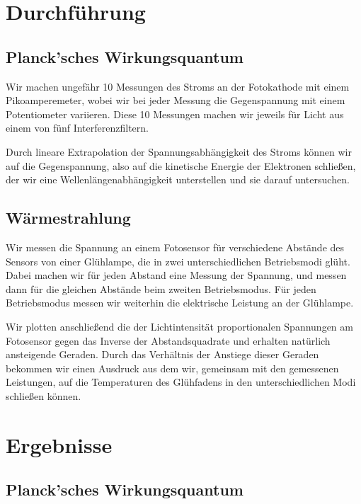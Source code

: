 \documentclass[12pt,a4paper,twopage]{article}
\begin{document}
\section{Durchführung}
\subsection{Planck'sches Wirkungsquantum}
Wir machen ungefähr 10 Messungen des Stroms an der Fotokathode mit einem Pikoamperemeter, wobei wir bei jeder Messung die Gegenspannung mit einem Potentiometer variieren. Diese 10 Messungen machen wir jeweils für Licht aus einem von fünf Interferenzfiltern.  

Durch lineare Extrapolation der Spannungsabhängigkeit des Stroms können wir auf die Gegenspannung, also auf die kinetische Energie der Elektronen schließen, der wir eine Wellenlängenabhängigkeit unterstellen und sie darauf untersuchen.
\subsection{Wärmestrahlung}
Wir messen die Spannung an einem Fotosensor für verschiedene Abstände des Sensors von einer Glühlampe, die in zwei unterschiedlichen Betriebsmodi glüht. Dabei machen wir für jeden Abstand eine Messung der Spannung, und messen dann für die gleichen Abstände beim zweiten Betriebsmodus. Für jeden Betriebsmodus messen wir weiterhin die elektrische Leistung an der Glühlampe.

 Wir plotten anschließend die der Lichtintensität proportionalen Spannungen am Fotosensor gegen das Inverse der Abstandsquadrate und erhalten natürlich ansteigende Geraden. Durch das Verhältnis der Anstiege dieser Geraden bekommen wir einen Ausdruck aus dem wir, gemeinsam mit den gemessenen Leistungen, auf die Temperaturen des Glühfadens in den unterschiedlichen Modi schließen können.

\section{Ergebnisse}
\subsection{Planck'sches Wirkungsquantum}
\end{document}
